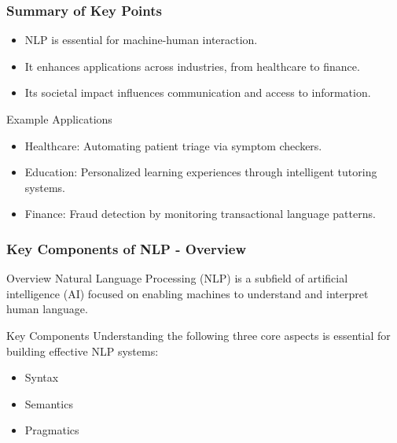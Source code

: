 \documentclass{beamer}
\begin{document}
\begin{frame}[fragile]
    \frametitle{Summary of Key Points}
    \begin{itemize}
        \item NLP is essential for machine-human interaction.
        \item It enhances applications across industries, from healthcare to finance.
        \item Its societal impact influences communication and access to information.
    \end{itemize}

    \begin{block}{Example Applications}
        \begin{itemize}
            \item Healthcare: Automating patient triage via symptom checkers.
            \item Education: Personalized learning experiences through intelligent tutoring systems.
            \item Finance: Fraud detection by monitoring transactional language patterns.
        \end{itemize}
    \end{block}
\end{frame}

\begin{frame}[fragile]
    \frametitle{Key Components of NLP - Overview}
    \begin{block}{Overview}
        Natural Language Processing (NLP) is a subfield of artificial intelligence (AI) focused on enabling machines to understand and interpret human language. 
    \end{block}
    \begin{block}{Key Components}
        Understanding the following three core aspects is essential for building effective NLP systems:
        \begin{itemize}
            \item Syntax
            \item Semantics
            \item Pragmatics
        \end{itemize}
    \end{block}
\end{frame}
\end{document}
